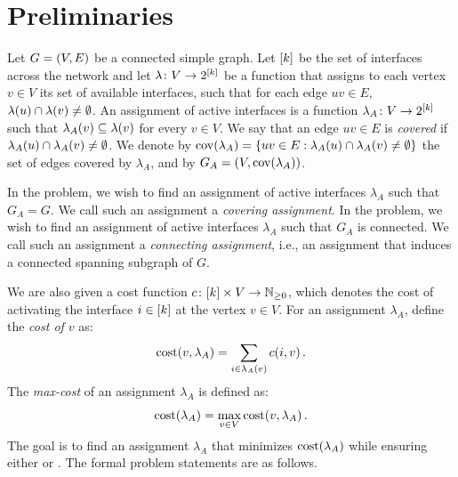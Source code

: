 ﻿\section{Preliminaries} \label{sec:preliminaries}

Let $G=\mathopen{}\left( V, E \right)$ be a connected simple graph. Let $\mathopen{}\left[ k \right]$ be the set of interfaces across the network and let $\lambda\colon V \to 2^{\mathopen{}\left[ k \right]}$ be a function that assigns to each vertex $v\in V$ its set of available interfaces, such that for each edge $uv \in E$, $\lambda\mathopen{}\left( u \right) \cap \lambda\mathopen{}\left( v \right) \neq \emptyset$.
An assignment of active interfaces is a function $\lambda_A\colon V \to 2^{\mathopen{}\left[ k \right]}$ such that $\lambda_A\mathopen{}\left( v \right) \subseteq \lambda\mathopen{}\left( v \right)$ for every $v\in V$. We say that an edge $uv \in E$ is \emph{covered} if $\lambda_A\mathopen{}\left( u \right) \cap \lambda_A\mathopen{}\left( v \right) \neq \emptyset$. We denote by $\operatorname{cov}\mathopen{}\left( \lambda_A \right) = \{uv \in E : \lambda_A\mathopen{}\left( u \right) \cap \lambda_A\mathopen{}\left( v \right) \neq \emptyset\}$ the set of edges covered by $\lambda_A$, and by $G_A=(V,\operatorname{cov}\mathopen{}\left( \lambda_A \right))$. %

In the \coverage problem, we wish to find an assignment of active interfaces $\lambda_A$ such that $G_A=G$. We call such an assignment a \emph{covering assignment}. In the \connectivity problem, we wish to find an assignment of active interfaces $\lambda_A$ such that $G_A$ is connected. We call such an assignment a \emph{connecting assignment}, i.e., an assignment that induces a connected spanning subgraph of $G$.

We are also given a cost function $c\colon \mathopen{}\left[ k \right]\times V \to \mathbb{N}_{\geq 0}$, which denotes the cost of activating the interface $i\in\mathopen{}\left[ k \right]$ at the vertex $v\in V$. 
For an assignment $\lambda_A$, define the \emph{cost of $v$} as:
$$\textnormal{cost}\mathopen{}\left( v, \lambda_A \right) = \sum_{i\in\lambda_A\mathopen{}\left( v \right)}c\mathopen{}\left( i, v \right).$$
The \emph{max-cost} of an assignment $\lambda_A$ is defined as:
$$\textnormal{cost} \mathopen{}\left( \lambda_A \right)=\max_{v\in V} \textnormal{cost}\mathopen{}\left( v, \lambda_A \right).$$
The goal is to find an assignment $\lambda_A$ that minimizes $\textnormal{cost} \mathopen{}\left( \lambda_A \right)$ while ensuring either \coverage or \connectivity. 
The formal problem statements are as follows.


